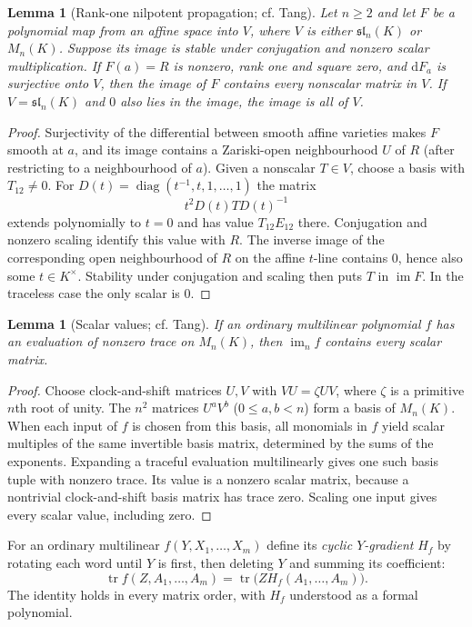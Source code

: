 \documentclass[11pt,reqno]{amsart}
\newcommand{\im}{\operatorname{im}}
\newcommand{\tr}{\operatorname{tr}}
\newcommand{\dd}{\mathrm d}
\theoremstyle{plain}
\newtheorem{lemma}[theorem]{Lemma}
\theoremstyle{definition}
\numberwithin{equation}{section}
\begin{document}
\begin{lemma}[Rank-one nilpotent propagation; cf. Tang]\label{lem:propagate}
Let $n\ge2$ and let $F$ be a polynomial map from an affine space into $V$, where $V$ is either $\mathfrak{sl}_n(K)$ or $M_n(K)$.  Suppose its image is stable under conjugation and nonzero scalar multiplication.  If $F(a)=R$ is nonzero, rank one and square zero, and $\dd F_a$ is surjective onto $V$, then the image of $F$ contains every nonscalar matrix in $V$.  If $V=\mathfrak{sl}_n(K)$ and $0$ also lies in the image, the image is all of $V$.
\end{lemma}
\begin{proof}
Surjectivity of the differential between smooth affine varieties makes $F$ smooth at $a$, and its image contains a Zariski-open neighbourhood $U$ of $R$ (after restricting to a neighbourhood of $a$).  Given a nonscalar $T\in V$, choose a basis with $T_{12}\ne0$.  For
$D(t)=\operatorname{diag}(t^{-1},t,1,\ldots,1)$ the matrix
\[
 t^2D(t)TD(t)^{-1}
\]
extends polynomially to $t=0$ and has value $T_{12}E_{12}$ there.  Conjugation and nonzero scaling identify this value with $R$.  The inverse image of the corresponding open neighbourhood of $R$ on the affine $t$-line contains $0$, hence also some $t\in K^\times$.  Stability under conjugation and scaling then puts $T$ in $\im F$.  In the traceless case the only scalar is $0$.
\end{proof}

\begin{lemma}[Scalar values; cf. Tang]\label{lem:scalar}
If an ordinary multilinear polynomial $f$ has an evaluation of nonzero trace on $M_n(K)$, then $\im_n f$ contains every scalar matrix.
\end{lemma}
\begin{proof}
Choose clock-and-shift matrices $U,V$ with $VU=\zeta UV$, where $\zeta$ is a primitive $n$th root of unity.  The $n^2$ matrices $U^aV^b$ ($0\le a,b<n$) form a basis of $M_n(K)$.  When each input of $f$ is chosen from this basis, all monomials in $f$ yield scalar multiples of the same invertible basis matrix, determined by the sums of the exponents.  Expanding a traceful evaluation multilinearly gives one such basis tuple with nonzero trace.  Its value is a nonzero scalar matrix, because a nontrivial clock-and-shift basis matrix has trace zero.  Scaling one input gives every scalar value, including zero.
\end{proof}

For an ordinary multilinear $f(Y,X_1,\ldots,X_m)$ define its \emph{cyclic $Y$-gradient} $H_f$ by rotating each word until $Y$ is first, then deleting $Y$ and summing its coefficient:
\begin{equation}\label{eq:gradient}
 \tr f(Z,A_1,\ldots,A_m)=\tr\bigl(ZH_f(A_1,\ldots,A_m)\bigr).
\end{equation}
The identity holds in every matrix order, with $H_f$ understood as a formal polynomial.
\end{document}
